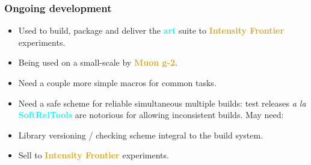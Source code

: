 \documentclass[xcolor={dvipsnames,table},c,compress,colorlinks]{beamer}
\newcommand{\productname}[1]{\textbf{\textcolor{cyan}{#1}}\xspace}
\newcommand{\expt}[1]{\textbf{\textcolor{Goldenrod}{#1}}\xspace}
\newcommand{\art}{\productname{art}}
\newcommand{\IF}{\expt{Intensity Frontier}}
\newcommand{\mg}{\expt{Muon g-2}}
\newcommand{\srt}{\productname{SoftRelTools}}
\begin{document}
\begin{frame}\frametitle{Ongoing development}
  \begin{itemize}
  \item Used to build, package and deliver the \art suite to \IF
    experiments.
  \item<2-> Being used on a small-scale by \mg.
  \item<3-> Need a couple more simple macros for common tasks.
  \item<4-> Need a safe scheme for reliable simultaneous multiple
    builds: test releases \textit{a la} \srt are notorious for allowing
    inconsistent builds. May need:
  \item<5-> Library versioning / checking scheme integral to the build
    system.
    \item<6->Sell to \IF experiments.
  \end{itemize}
\end{frame}
\end{document}
